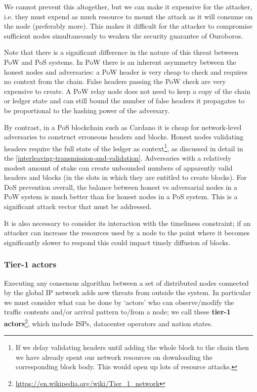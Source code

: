 \documentclass[11pt,a4paper]{article}
\begin{document}
We cannot prevent this altogether, but we can make it expensive for the
attacker, i.e. they must expend as much resource to mount the attack as
it will consume on the node (preferably more). This makes it difficult
for the attacker to compromise sufficient nodes simultaneously to weaken
the security guarantee of Ouroboros.

Note that there is a significant difference in the nature of this threat
between PoW and PoS systems. In PoW there is an inherent asymmetry
between the honest nodes and adversaries: a PoW header is very cheap to
check and requires no context from the chain. False headers passing the
PoW check are very expensive to create. A PoW relay node does not need
to keep a copy of the chain or ledger state and can still bound the
number of false headers it propagates to be proportional to the hashing
power of the adversary.

By contrast, in a PoS blockchain such as Cardano it is cheap for
network-level adversaries to construct erroneous headers and blocks.
Honest nodes validating headers require the full state of the ledger as
context\footnote{If we delay validating headers until adding the whole
  block to the chain then we have already spent our network resources on
  downloading the corresponding block body. This would open up lots of
  resource attacks.}, as discussed in detail in the
\cref{interleaving-transmission-and-validation}. Adversaries with a relatively modest amount of stake can create
unbounded numbers of apparently valid headers and blocks (in the slots
in which they are entitled to create blocks). For DoS prevention
overall, the balance between honest vs adversarial nodes in a PoW system
is much better than for honest nodes in a PoS system. This is a
significant attack vector that must be addressed.

It is also necessary to consider its interaction with the timeliness
constraint; if an attacker can increase the resources used by a node to
the point where it becomes significantly slower to respond this could
impact timely diffusion of blocks.

\subsubsection{Tier-1 actors}
\label{tier-1-actors}

Executing any consensus algorithm between a set of distributed nodes
connected by the global IP network adds new threats from outside the
system. In particular we must consider what can be done by `actors' who
can observe/modify the traffic contents and/or arrival pattern to/from a
node; we call these \textbf{tier-1 actors}\footnote{\href{https://en.wikipedia.org/wiki/Tier_1_network}{{https://en.wikipedia.org/wiki/Tier\_1\_network}}},
which include ISPs, datacenter operators and nation states.
\end{document}
